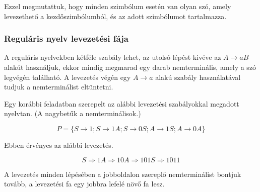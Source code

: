 \documentclass[a4paper]{article}
\begin{document}
Ezzel megmutattuk, hogy minden szimbólum esetén van olyan szó, amely
levezethető a kezdőszimbólumból, és az adott szimbólumot tartalmazza.

\subsubsection{Reguláris nyelv levezetési fája}

A reguláris nyelvekben kétféle szabály lehet, az utolsó lépést kivéve az
$A \to aB$ alakút használjuk, ekkor mindig megmarad egy darab
nemterminális, amely a szó legvégén található. A levezetés végén egy $A
\to a$ alakú szabály használatával tudjuk a nemterminálist eltüntetni.

Egy korábbi feladatban szerepelt az alábbi levezetési szabályokkal
megadott nyelvtan. (A nagybetűk a nemterminálisok.)

\[P=\{S\rightarrow 1; S\rightarrow 1A; S\rightarrow 0S; A\rightarrow 1S; A\rightarrow 0A\}\]

Ebben érvényes az alábbi levezetés.

\[
 S \Rightarrow 1A \Rightarrow 10A \Rightarrow 101S \Rightarrow 1011
\]

A levezetés minden lépésében a jobboldalon szereplő nemterminálist
bontjuk tovább, a levezetési fa egy jobbra lefelé növő fa lesz.

\end{document}
